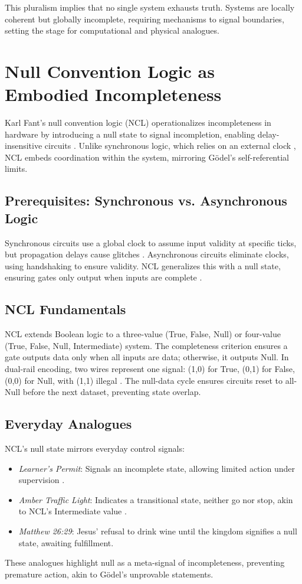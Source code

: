 \documentclass{article}
\begin{document}
This pluralism implies that no single system exhausts truth. Systems are locally coherent but globally incomplete, requiring mechanisms to signal boundaries, setting the stage for computational and physical analogues.

\section{Null Convention Logic as Embodied Incompleteness}
\label{sec:ncl}
Karl Fant's null convention logic (NCL) operationalizes incompleteness in hardware by introducing a null state to signal incompletion, enabling delay-insensitive circuits \citep{fant2005}. Unlike synchronous logic, which relies on an external clock \citep{seitz1980}, NCL embeds coordination within the system, mirroring G\"{o}del's self-referential limits.

\subsection{Prerequisites: Synchronous vs. Asynchronous Logic}
Synchronous circuits use a global clock to assume input validity at specific ticks, but propagation delays cause glitches \citep{seitz1980}. Asynchronous circuits eliminate clocks, using handshaking to ensure validity. NCL generalizes this with a null state, ensuring gates only output when inputs are complete \citep{fant2005}.

\subsection{NCL Fundamentals}
NCL extends Boolean logic to a three-value (True, False, Null) or four-value (True, False, Null, Intermediate) system. The completeness criterion ensures a gate outputs data only when all inputs are data; otherwise, it outputs Null. In dual-rail encoding, two wires represent one signal: (1,0) for True, (0,1) for False, (0,0) for Null, with (1,1) illegal \citep{fant2005}. The null-data cycle ensures circuits reset to all-Null before the next dataset, preventing state overlap.

\subsection{Everyday Analogues}
NCL's null state mirrors everyday control signals:
\begin{itemize}
    \item \textit{Learner's Permit}: Signals an incomplete state, allowing limited action under supervision \citep{fant2005}.
    \item \textit{Amber Traffic Light}: Indicates a transitional state, neither go nor stop, akin to NCL's Intermediate value \citep{fant2005}.
    \item \textit{Matthew 26:29}: Jesus' refusal to drink wine until the kingdom signifies a null state, awaiting fulfillment.
\end{itemize}
These analogues highlight null as a meta-signal of incompleteness, preventing premature action, akin to G\"{o}del's unprovable statements.
\end{document}
